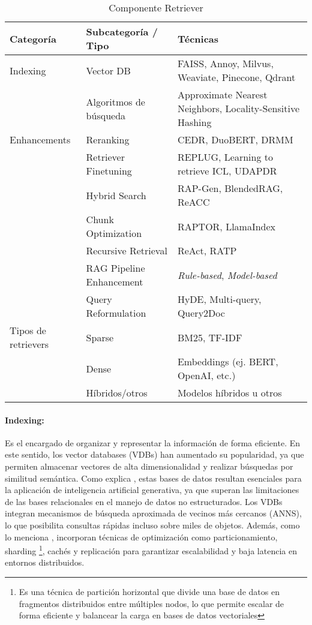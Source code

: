 \begin{table}[htbp]
\centering
\begin{tabularx}{\textwidth}{l l X}
\toprule
\textbf{Categoría} & \textbf{Subcategoría / Tipo} & \textbf{Técnicas} \\
\midrule
Indexing     & Vector DB               & FAISS, Annoy, Milvus, Weaviate, Pinecone, Qdrant\\
              & Algoritmos de búsqueda  & Approximate Nearest Neighbors, Locality-Sensitive Hashing \\
\midrule
Enhancements & Reranking               & CEDR, DuoBERT, DRMM\\
              & Retriever Finetuning    & REPLUG, Learning to retrieve ICL, UDAPDR \\
              & Hybrid Search           & RAP-Gen, BlendedRAG, ReACC\\
              & Chunk Optimization      & RAPTOR, LlamaIndex  \\
              & Recursive Retrieval     & ReAct, RATP \\
              & RAG Pipeline Enhancement  & \textit{Rule-based}, \textit{Model-based} \\
              & Query Reformulation     &  HyDE, Multi-query, Query2Doc\\
\midrule
Tipos de retrievers & Sparse            & BM25, TF-IDF \\
                    & Dense             & Embeddings (ej. BERT, OpenAI, etc.) \\
                    & Híbridos/otros            & Modelos híbridos u otros \\
\bottomrule
\end{tabularx}
\caption{Componente Retriever}
\label{tab:retriver}
\end{table}

\paragraph{Indexing:} Es el encargado de organizar y representar la información de forma eficiente. En este sentido, los vector databases (VDBs) han aumentado su popularidad, ya que permiten almacenar 
vectores de alta dimensionalidad y realizar búsquedas por similitud semántica. Como explica \textcite{joshi2025vector}, estas bases de datos resultan esenciales para 
la aplicación de inteligencia artificial generativa, ya que superan las limitaciones de las bases relacionales en el manejo de datos no estructurados.  
Los VDBs integran mecanismos de búsqueda aproximada de vecinos más cercanos (ANNS), lo que posibilita consultas rápidas incluso sobre miles de objetos. Además, como lo menciona
\textcite{ma2025vector}, incorporan técnicas de optimización como particionamiento, sharding \footnote{ Es una técnica de partición horizontal que divide una base de datos
 en fragmentos distribuidos entre múltiples nodos, lo que permite escalar de forma eficiente y balancear la carga en bases de datos vectoriales},
  cachés y replicación para garantizar escalabilidad y baja latencia en entornos distribuidos.  

